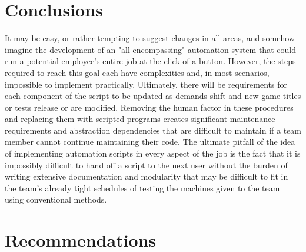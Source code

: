 \documentclass[12pt]{article}
\begin{document}




\newpage
\section{Conclusions}



\indent\hspace{0.5in} It may be easy, or rather tempting to suggest changes in all areas, and somehow imagine the development of an "all-encompassing" automation system that could run a potential employee's entire job at the click of a button. However, the steps required to reach this goal each have complexities and, in most scenarios, impossible to implement practically. Ultimately, there will be requirements for each component of the script to be updated as demands shift and new game titles or tests release or are modified. Removing the human factor in these procedures and replacing them with scripted programs creates significant maintenance requirements and abstraction dependencies that are difficult to maintain if a team member cannot continue maintaining their code. The ultimate pitfall of the idea of implementing automation scripts in every aspect of the job is the fact that it is impossibly difficult to hand off a script to the next user without the burden of writing extensive documentation and modularity that may be difficult to fit in the team's already tight schedules of testing the machines given to the team using conventional methods.

\newpage
\section{Recommendations}
\end{document}
